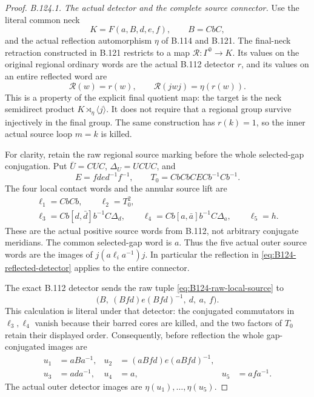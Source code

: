 \begin{proof}
\emph{B.124.1. The actual detector and the complete source connector.}
Use the literal common neck
\[
 K=F(a,B,d,e,f),\qquad B=CbC,
\]
and the actual reflection automorphism $\eta$ of B.114 and B.121.
The final-neck retraction constructed in B.121 restricts to a map
$\mathcal R:\Gamma^0\to K$. Its values on the original regional
ordinary words are the actual B.112 detector $r$, and its values
on an entire reflected word are
\begin{equation}\label{eq:B124-reflected-detector}
 \mathcal R(w)=r(w),\qquad
 \mathcal R(jwj)=\eta(r(w)).
\end{equation}
This is a property of the explicit final quotient map: the target
is the neck semidirect product $K\rtimes_\eta\langle j\rangle$.
It does not require that a regional group survive injectively
in the final group. The same construction has $r(k)=1$, so the
inner actual source loop $m=k$ is killed.

For clarity, retain the raw regional source marking before the
whole selected-gap conjugation. Put $\bar U=CUC$,
$\Delta_U=UCUC$, and
\[
 E=fde d^{-1}f^{-1},\qquad
 T_0=CbCbCECb^{-1}Cb^{-1}.
\]
The four local contact words and the annular source lift are
\begin{equation}\label{eq:B124-raw-local-source}
 \begin{gathered}
 \ell_1=CbCb,\qquad \ell_2=T_0^2,\\
 \ell_3=Cb[d,\bar d]b^{-1}C\Delta_d,\qquad
 \ell_4=Cb[a,\bar a]b^{-1}C\Delta_a,\qquad \ell_5=h.
 \end{gathered}
\end{equation}
These are the actual positive source words from B.112, not arbitrary
conjugate meridians. The common selected-gap word is $a$. Thus the
five actual outer source words are the images of
$j(a\ell_i a^{-1})j$. In particular the reflection in
\eqref{eq:B124-reflected-detector} applies to the entire connector.

The exact B.112 detector sends the raw tuple
\eqref{eq:B124-raw-local-source} to
\[
 \bigl(B,\ (Bfd)e(Bfd)^{-1},\ d,\ a,\ f\bigr).
\]
This calculation is literal under that detector: the conjugated
commutators in $\ell_3,\ell_4$ vanish because their barred cores
are killed, and the two factors of $T_0$ retain their displayed
order. Consequently, before reflection the whole gap-conjugated
images are
\begin{equation}\label{eq:B124-five-basis}
 \begin{aligned}
 u_1&=aBa^{-1},&
 u_2&=(aBfd)e(aBfd)^{-1},\\
 u_3&=ada^{-1},&u_4&=a,&u_5&=afa^{-1}.
 \end{aligned}
\end{equation}
The actual outer detector images are $\eta(u_1),\ldots,\eta(u_5)$.


\end{proof}
